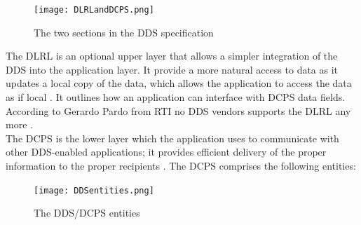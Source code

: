 \documentclass[Main]{subfiles}
\begin{document}
\begin{figure}[H]
\centering
\texttt{[image: DLRLandDCPS.png]}
\caption{The two sections in the DDS specification \cite{DDS-slides}}
\label{Fig:DLRL}
\end{figure}

The DLRL is an optional upper layer that allows a simpler integration of the DDS into the application layer. It provide a more natural access to data as it updates a local copy of the data, which allows the application to access the data as if local \cite{DDS-slides}. It outlines how an application can interface with DCPS data fields. According to Gerardo Pardo from RTI no DDS vendors supports the DLRL any more \cite{DLRL-support}.\\
The DCPS is the lower layer which the application uses to communicate with other DDS-enabled applications; it provides efficient delivery of the proper information to the proper recipients \cite{wiki-DDS}. The DCPS comprises the following entities:

\begin{figure}[H]
\centering
\texttt{[image: DDSentities.png]}
\caption{The DDS/DCPS entities \cite{RTI}}
\label{Fig:Entities}
\end{figure}
\end{document}

